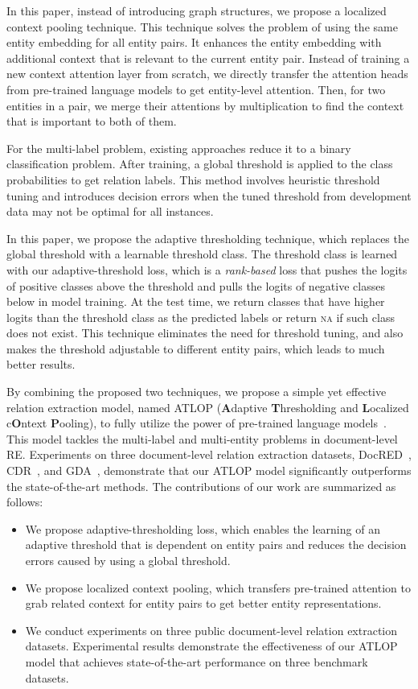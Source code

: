 \documentclass[letterpaper]{article}
\begin{document}
In this paper, instead of introducing graph structures, we propose a localized context pooling technique.
This technique solves the problem of using the same entity embedding for all entity pairs.
It enhances the entity embedding with additional context that is relevant to the current entity pair.
Instead of training a new context attention layer from scratch, we directly transfer the attention heads from pre-trained language models to get entity-level attention.
Then, for two entities in a pair, we merge their attentions by multiplication to find the context that is important to both of them.


For the multi-label problem, existing approaches reduce it to a binary classification problem.
After training, a global threshold is applied to the class probabilities to get relation labels.
This method involves heuristic threshold tuning and introduces decision errors when the tuned threshold from development data may not be optimal for all instances.

In this paper, we propose the adaptive thresholding technique, which replaces the global threshold with a learnable threshold class.
The threshold class is learned with our adaptive-threshold loss, which is a {\em rank-based} loss that pushes the logits of positive classes above the threshold and pulls the logits of negative classes below in model training.
At the test time, we return classes that have higher logits than the threshold class as the predicted labels or return \textsc{na} if such class does not exist.
This technique eliminates the need for threshold tuning, and also makes the threshold adjustable to different entity pairs, which leads to much better results.

By combining the proposed two techniques, we propose a simple yet effective relation extraction model, named ATLOP (\textbf{A}daptive \textbf{T}hresholding and \textbf{L}ocalized c\textbf{O}ntext \textbf{P}ooling), to fully utilize the power of pre-trained language models~\cite{Devlin2019BERTPO,Liu2019RoBERTaAR}.
This model tackles the multi-label and multi-entity problems in document-level RE.
Experiments on three document-level relation extraction datasets, DocRED~\cite{Yao2019DocREDAL}, CDR~\cite{Li2016BioCreativeVC}, and GDA~\cite{Wu2019RENETAD}, demonstrate that our ATLOP model significantly outperforms the state-of-the-art methods.
The contributions of our work are summarized as follows:
\begin{itemize}
    \item We propose adaptive-thresholding loss, which enables the learning of an adaptive threshold that is dependent on entity pairs and reduces the decision errors caused by using a global threshold.
    \item We propose localized context pooling, which transfers pre-trained attention to grab related context for entity pairs to get better entity representations. 

    \item We conduct experiments on three public document-level relation extraction datasets. Experimental results demonstrate the effectiveness of our ATLOP model that achieves state-of-the-art performance on three benchmark datasets.
\end{itemize}
\end{document}

